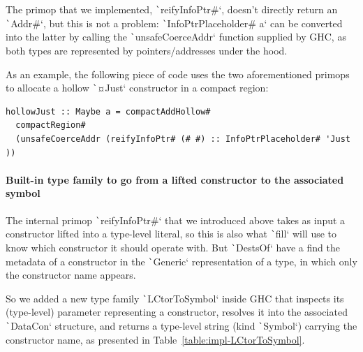 \documentclass[english]{jflart}
\newlength{\currentparskip}
\newenvironment{unbreakable}
{%
  \setlength{\currentparskip}{\parskip}%
  \setlength{\parskip}{\currentparskip}%
  \par\vspace{0.5\baselineskip}%
  \noindent\begin{minipage}{\textwidth}%
    \setlength{\parskip}{\currentparskip}%
}
{%
  \end{minipage}%
  \par\vspace{0.5\baselineskip}%
}
\begin{document}
The primop that we implemented, \texttt`reifyInfoPtr#`, doesn't directly return an \texttt`Addr#`, but this is not a problem: \texttt`InfoPtrPlaceholder# a` can be converted into the latter by calling the \texttt`unsafeCoerceAddr` function supplied by GHC, as both types are represented by pointers/addresses under the hood.

As an example, the following piece of code uses the two aforementioned primops to allocate a hollow \texttt`¤Just` constructor in a compact region:

\begin{unbreakable}
{\small
\begin{verbatim}
hollowJust :: Maybe a = compactAddHollow#
  compactRegion#
  (unsafeCoerceAddr (reifyInfoPtr# (# #) :: InfoPtrPlaceholder# 'Just ))
\end{verbatim}
}
\end{unbreakable}

\paragraph{Built-in type family to go from a lifted constructor to the associated symbol}

The internal primop \texttt`reifyInfoPtr#` that we introduced above takes as input a constructor lifted into a type-level literal, so this is also what \texttt`fill` will use to know which constructor it should operate with. But \texttt`DestsOf` have a find the metadata of a constructor in the \texttt`Generic` representation of a type, in which only the constructor name appears.

So we added a new type family \texttt`LCtorToSymbol` inside GHC that inspects its (type-level) parameter representing a constructor, resolves it into the associated \texttt`DataCon` structure, and returns a type-level string (kind \texttt`Symbol`) carrying the constructor name, as presented in Table~\ref{table:impl-LCtorToSymbol}.
\end{document}
